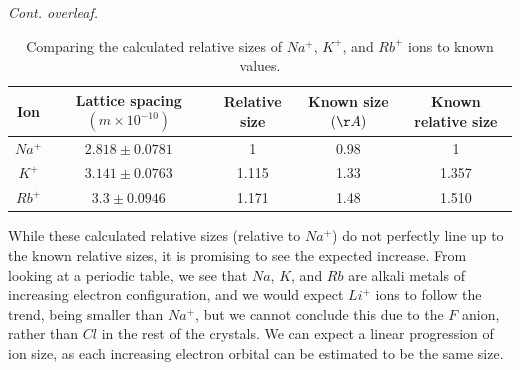 \documentclass[a4paper]{article}
\begin{document}
\begin{flushright}
{\it Cont. overleaf.}
\end{flushright}
\newpage
\begin{table}[h!]
\centering
\begin{tabular}{ccccc}
\hline
Ion & Lattice spacing $(m\times10^{-10})$ & Relative size & Known size $(\r A)$ & Known relative size \\ \hline
$Na^+$ & $2.818 \pm 0.0781$ & 1 & 0.98 & 1 \\
$K^+$ & $3.141\pm0.0763$ & 1.115 & 1.33 & 1.357 \\
$Rb^+$ & $3.3\pm0.0946$ & 1.171 & 1.48 & 1.510 \\
\end{tabular}
\caption{\label{tab:comparison}Comparing the calculated relative sizes of $Na^+$, $K^+$, and $Rb^+$ ions to known values.}
\end{table}

While these calculated relative sizes (relative to $Na^+$) do not perfectly line up to the known relative sizes, it is promising to see the expected increase. From looking at a periodic table, we see that $Na$, $K$, and $Rb$ are alkali metals of increasing electron configuration, and we would expect $Li^+$ ions to follow the trend, being smaller than $Na^+$, but we cannot conclude this due to the $F$ anion, rather than $Cl$ in the rest of the crystals. We can expect a linear progression of ion size, as each increasing electron orbital can be estimated to be the same size. 
\end{document}
